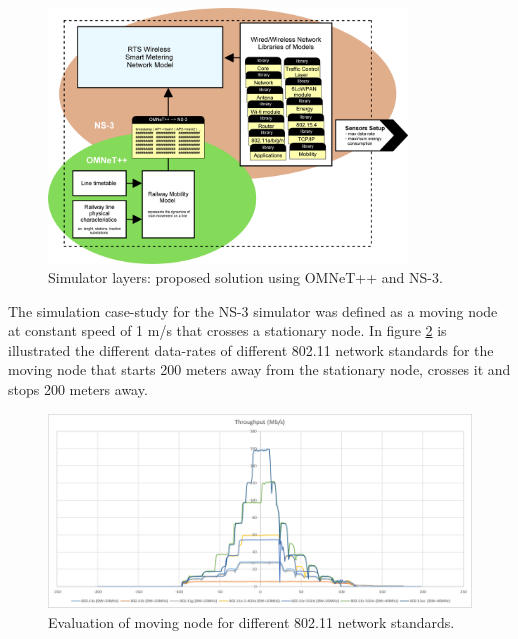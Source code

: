 \begin{figure}[h!]
	\centering
	\includegraphics[width=0.85\textwidth,keepaspectratio]{figures/50.PreliminaryW/omnetpp+ns32}
	\caption{Simulator layers: proposed solution using OMNeT++ and NS-3.}
	\label{fig:5.omnetpp+ns3}
\end{figure}

The simulation case-study for the NS-3 simulator was defined as a moving node at constant speed of 1 m/s that crosses a stationary node. In figure \ref{fig:5.distance-rate} is illustrated the different data-rates of different  802.11 network standards for the moving node that starts 200 meters away from the stationary node, crosses it and stops 200 meters away.

\begin{figure}[h!]
	\centering
	\includegraphics[width=\textwidth,keepaspectratio]{figures/50.PreliminaryW/distance-rate}
	\caption{Evaluation of moving node for different 802.11 network standards.}
	\label{fig:5.distance-rate}
\end{figure}


